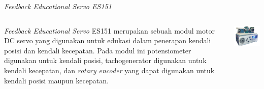 \documentclass[10pt,xcolor={dvipsnames}]{beamer}
\begin{document}
	\begin{frame}{\textit{Feedback Educational Servo ES151}}
		\begin{columns}[T] %
			\begin{column}{0.48\textwidth}
				\vspace{0.5cm}
				\justifying \textit{Feedback Educational Servo} ES151 merupakan sebuah modul motor DC servo yang digunakan untuk edukasi dalam penerapan kendali posisi dan kendali kecepatan.
				\vspace{0.5cm}
				\newline \justifying Pada modul ini potensiometer digunakan untuk kendali posisi, tachogenerator digunakan untuk kendali kecepatan, dan \textit{rotary encoder} yang dapat digunakan untuk kendali posisi maupun kecepatan. 
			\end{column}%
			\hfill%
			\begin{column}{0.48\textwidth}
				\centering
				\includegraphics[width=7cm]{Gambar Lain/removed bg-modul.png}
			\end{column}
		\end{columns}
	\end{frame}
	
\end{document}
